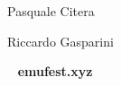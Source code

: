 \medskip

\textbf{}

Pasquale Citera

\medskip




%


\textbf{}

Riccardo Gasparini

\medskip


~\vfill
\centering
\textbf{emufest.xyz}


%
